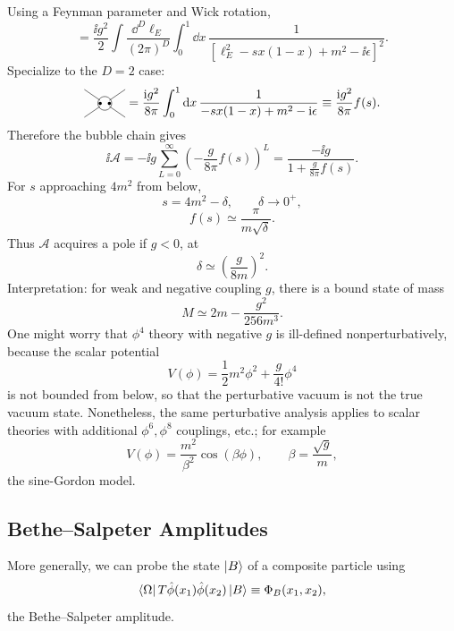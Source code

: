 Using a Feynman parameter and Wick rotation,
\[
  =
  \frac{\ii g^2}{2}
  \int \frac{\dd^D\ell_E}{(2\pi)^D}
  \int_0^1\dd x\,
  \frac{1}{\left[\ell_E^2-sx(1-x)+m^2-\ii\epsilon\right]^2}.
\]
Specialize to the \(D=2\) case:
\[
\begin{tikzpicture}[baseline=-0.55ex,scale=0.72]
  \draw (-0.8,0.55) -- (-0.18,0.12);
  \draw (-0.8,-0.55) -- (-0.18,-0.12);
  \draw (0.18,0.12) -- (0.8,0.55);
  \draw (0.18,-0.12) -- (0.8,-0.55);
  \draw (0,0) circle (0.27);
  \fill (-0.18,0) circle (1.8pt);
  \fill (0.18,0) circle (1.8pt);
\end{tikzpicture}
=
\frac{\ii g^2}{8\pi}
\int_0^1\dd x\,
\frac{1}{-sx(1-x)+m^2-\ii\epsilon}
\equiv
\frac{\ii g^2}{8\pi}f(s).
\]
Therefore the bubble chain gives
\[
  \ii\mathcal A
  =
  -\ii g
  \sum_{L=0}^\infty
  \left(-\frac{g}{8\pi}f(s)\right)^L
  =
  \frac{-\ii g}{1+\frac{g}{8\pi}f(s)}.
\]
For \(s\) approaching \(4m^2\) from below,
\[
  s=4m^2-\delta,\qquad \delta\to0^+,
\]
\[
  f(s)\simeq\frac{\pi}{m\sqrt{\delta}}.
\]
Thus \(\mathcal A\) acquires a pole if \(g<0\), at
\[
  \delta\simeq\left(\frac{g}{8m}\right)^2.
\]
Interpretation: for weak and negative coupling \(g\), there is a bound
state of mass
\[
  M\simeq 2m-\frac{g^2}{256m^3}.
\]
One might worry that \(\phi^4\) theory with negative \(g\) is
ill-defined nonperturbatively, because the scalar potential
\[
  V(\phi)=\frac12m^2\phi^2+\frac{g}{4!}\phi^4
\]
is not bounded from below, so that the perturbative vacuum is not the
true vacuum state.  Nonetheless, the same perturbative analysis applies
to scalar theories with additional \(\phi^6,\phi^8\) couplings, etc.;
for example
\[
  V(\phi)=\frac{m^2}{\beta^2}\cos(\beta\phi),
  \qquad
  \beta=\frac{\sqrt g}{m},
\]
the sine-Gordon model.

\subsection{Bethe--Salpeter Amplitudes}

More generally, we can probe the state \(\ket{B}\) of a composite
particle using
\[
  \bra{\Omega}T\hat\phi(x_1)\hat\phi(x_2)\ket{B}
  \equiv \Phi_B(x_1,x_2),
\]
the Bethe--Salpeter amplitude.

